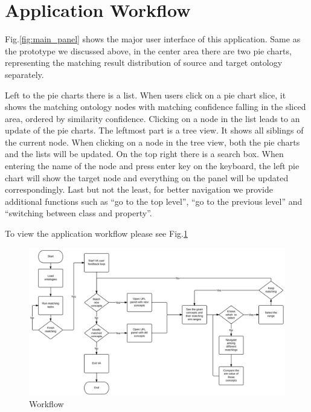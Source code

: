 \section{Application Workflow}
\label{sub:application_work_flow}
Fig.\ref{fig:main_panel} shows the major user interface of this application. Same as the prototype we discussed above, in the center area there are two pie charts, representing the matching result distribution of source and target ontology separately. 

Left to the pie charts there is a list. When users click on a pie chart slice, it shows the matching ontology nodes with matching confidence falling in the sliced area, ordered by similarity confidence. Clicking on a node in the list leads to an update of the pie charts. The leftmost part is a tree view. It shows all siblings of the current node. When clicking on a node in the tree view, both the pie charts and the lists will be updated. On the top right there is a search box. When entering the name of the node and press enter key on the keyboard, the left pie chart will show the target node and everything on the panel will be updated correspondingly. Last but not the least, for better navigation we provide additional functions such as ``go to the top level'', ``go to the previous level'' and ``switching between class and property''.

To view the application workflow please see Fig.\ref{fig:workflow}

\begin{figure}[!ht]
	\centering
	\includegraphics[width=6.5in]{pics/flow.png}
	\caption{Workflow}
	\label{fig:workflow}
\end{figure}

